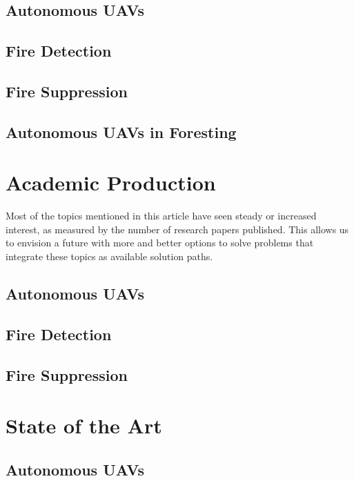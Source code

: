 \documentclass[runningheads]{llncs}
\begin{document}
\subsection{Autonomous UAVs}


\subsection{Fire Detection}



\subsection{Fire Suppression}


\subsection{Autonomous UAVs in Foresting}


\section{Academic Production}

Most of the topics mentioned in this article have seen steady or increased interest, as measured by the number of research papers published. This allows us to envision a future with more and better options to solve problems that integrate these topics as available solution paths.

\subsection{Autonomous UAVs}

\subsection{Fire Detection}

\subsection{Fire Suppression}

\section{State of the Art}

\subsection{Autonomous UAVs}
\end{document}

